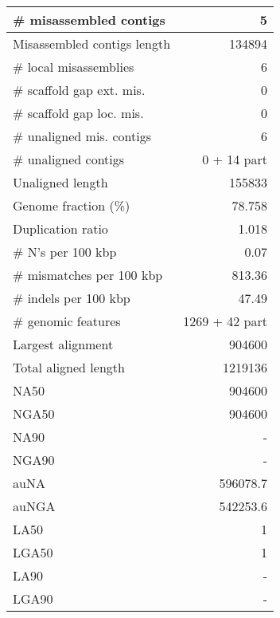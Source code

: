 \documentclass[12pt,a4paper]{article}
\begin{document}
\begin{table}[ht]
\begin{center}
\begin{tabular}{|l*{1}{|r}|}
\# misassembled contigs & 5 \\ \hline
Misassembled contigs length & 134894 \\ \hline
\# local misassemblies & 6 \\ \hline
\# scaffold gap ext. mis. & 0 \\ \hline
\# scaffold gap loc. mis. & 0 \\ \hline
\# unaligned mis. contigs & 6 \\ \hline
\# unaligned contigs & 0 + 14 part \\ \hline
Unaligned length & 155833 \\ \hline
Genome fraction (\%) & 78.758 \\ \hline
Duplication ratio & 1.018 \\ \hline
\# N's per 100 kbp & 0.07 \\ \hline
\# mismatches per 100 kbp & 813.36 \\ \hline
\# indels per 100 kbp & 47.49 \\ \hline
\# genomic features & 1269 + 42 part \\ \hline
Largest alignment & 904600 \\ \hline
Total aligned length & 1219136 \\ \hline
NA50 & 904600 \\ \hline
NGA50 & 904600 \\ \hline
NA90 & - \\ \hline
NGA90 & - \\ \hline
auNA & 596078.7 \\ \hline
auNGA & 542253.6 \\ \hline
LA50 & 1 \\ \hline
LGA50 & 1 \\ \hline
LA90 & - \\ \hline
LGA90 & - \\ \hline
\end{tabular}
\end{center}
\end{table}
\end{document}
